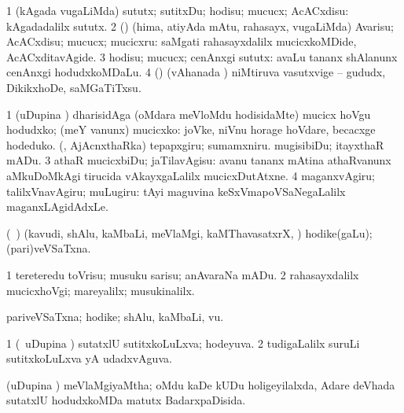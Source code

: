 \begin{center}
\noindent
\gl{\sakirx}
\bmng
\bnum
\num{1} (kAgada \mo vugaLiMda) sututx; sutitxDu; hodisu; mucucx; AcACxdisu:  kAgadadalilx sututx. 
\num{2} (\rUpa) (hima, atiyAda mAtu, rahasayx, \mo vugaLiMda) Avarisu; AcACxdisu; mucucx; mucicxru:  saMgati rahasayxdalilx mucicxkoMDide, AcACxditavAgide. 
\num{3} hodisu; mucucx; cenAnxgi sututx:  avaLu tananx shAlanunx cenAnxgi hodudxkoMDaLu. 
\num{4} (\ashi) (vAhanada \vi) niMtiruva vasutxvige -- gududx, DikikxhoDe, saMGaTiTxsu. 
\enum
\emng

\noindent
\gl{\pagu}
\expl{}
\bmng
\bnum
\num{1}  (uDupina \vi) dharisidAga (oMdara meVloMdu hodisidaMte) mucicx hoVgu 
  
\banum
{} hodudxko; (meY \mo vanunx) mucicxko:  joVke, niVnu horage hoVdare, becacxge hodeduko. 
 (\ashi, AjAcnxthaRka) tepapxgiru; sumamxniru. 
 mugisibiDu; itayxthaR mADu. 
\eanum
\numie
\num{3}  athaR mucicxbiDu; jaTilavAgisu:  avanu tananx mAtina athaRvanunx aMkuDoMkAgi tirucida vAkayxgaLalilx mucicxDutAtxne. 
\num{4}  maganxvAgiru; talilxVnavAgiru; muLugiru:  tAyi maguvina keSxVmapoVSaNegaLalilx maganxLAgidAdxLe. 
\enum
\emng
\eentry

\bentry
{} 
\gl{\nA}
\expl{}
\bmng
(\sA\ \bava) (kavudi, shAlu, kaMbaLi, meVlaMgi, kaMThavasatxrX, \mo) hodike(gaLu); (pari)veVSaTxna. 
\emng

\noindent
\gl{\pagu}
\expl{}
\bmng
\bnum
\num{1}  tereteredu toVrisu; musuku sarisu; anAvaraNa mADu. 
\num{2}  rahasayxdalilx mucicxhoVgi; mareyalilx; musukinalilx. 
\enum
\emng
\eentry

\bentry 
{} 
\gl{\nA}
\expl{}
\bmng
pariveVSaTxna; hodike; shAlu, kaMbaLi, \mo vu. 
\emng
\eentry

\bentry 
{} 
\gl{\gu}
\expl{}
\bmng
\bnum
\num{1} (\kanmu\ uDupina \vi) sutatxlU sutitxkoLuLxva; hodeyuva. 
\num{2} tudigaLalilx suruLi sutitxkoLuLxva yA udadxvAguva. 
\enum
\emng
\eentry

\bentry
{} 
\gl{\gu}
\expl{}
\bmng
(uDupina \vi) meVlaMgiyaMtha; oMdu kaDe kUDu holigeyilalxda, Adare deVhada sutatxlU hodudxkoMDa matutx BadarxpaDisida. 
\emng
\eentry


\end{center}
